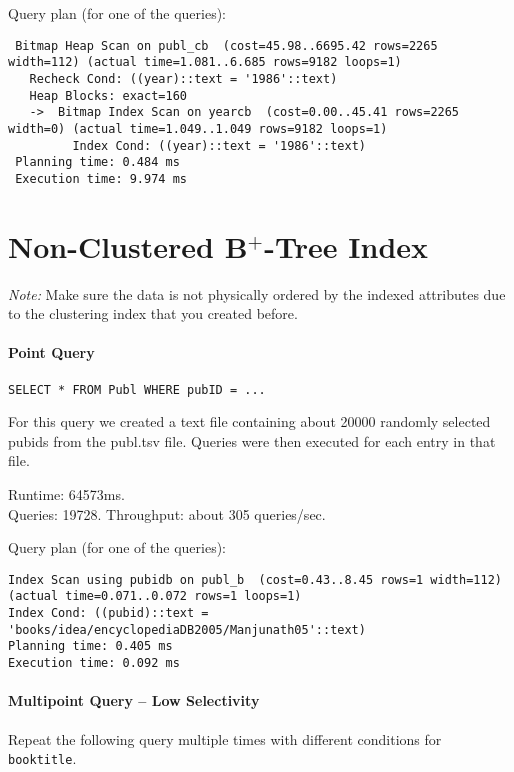 \documentclass[11pt]{scrartcl}
\begin{document}
\smallskip\noindent
Query plan (for one of the queries):
{\small
\begin{verbatim}
 Bitmap Heap Scan on publ_cb  (cost=45.98..6695.42 rows=2265 width=112) (actual time=1.081..6.685 rows=9182 loops=1)
   Recheck Cond: ((year)::text = '1986'::text)
   Heap Blocks: exact=160
   ->  Bitmap Index Scan on yearcb  (cost=0.00..45.41 rows=2265 width=0) (actual time=1.049..1.049 rows=9182 loops=1)
         Index Cond: ((year)::text = '1986'::text)
 Planning time: 0.484 ms
 Execution time: 9.974 ms
\end{verbatim}
}

\section{Non-Clustered B$^+$-Tree Index}

\noindent \emph{Note:} Make sure the data is not physically ordered by
the indexed attributes due to the clustering index that you created
before.

\paragraph{Point Query}

{\small
\begin{verbatim}
SELECT * FROM Publ WHERE pubID = ...
\end{verbatim}
}

\noindent
For this query we created a text file containing about 20000 randomly selected pubids from the publ.tsv file. Queries were then executed for each entry in that file.

\smallskip\noindent
Runtime: 64573ms. \\
Queries: 19728.
Throughput: about 305 queries/sec.

\smallskip\noindent
Query plan (for one of the queries):
{\small
\begin{verbatim}
Index Scan using pubidb on publ_b  (cost=0.43..8.45 rows=1 width=112) (actual time=0.071..0.072 rows=1 loops=1)
Index Cond: ((pubid)::text = 'books/idea/encyclopediaDB2005/Manjunath05'::text)
Planning time: 0.405 ms
Execution time: 0.092 ms
\end{verbatim}
}


\paragraph{Multipoint Query -- Low Selectivity}

Repeat the following query multiple times with different conditions for {\tt booktitle}.
\end{document}
